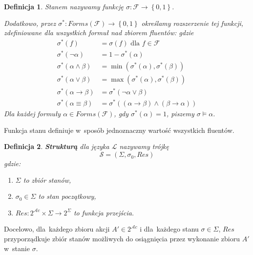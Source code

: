 \documentclass[11pt,a4paper]{article}
\newtheorem{defn}{Definicja}
\begin{document}
\begin{defn}
    Stanem nazywamy funkcję $\sigma : \mathcal{F} \rightarrow \left\{0,1\right\}$.

    Dodatkowo, przez $\sigma^{*} : Forms(\mathcal{F}) \rightarrow \left\{0,1\right\}$ określamy rozszerzenie tej funkcji, zdefiniowane dla wszystkich formuł nad zbiorem fluentów:
    gdzie
    \begin{align*}
        \sigma^{*}\left(f\right) &= \sigma\left(f\right) \text{ dla } f \in \mathcal{F} \\
        \sigma^{*}\left(\neg \alpha\right) &= 1 - \sigma^{*}\left(\alpha\right) \\
        \sigma^{*}\left(\alpha \land \beta\right) &= \min \left(\sigma^{*}\left(\alpha\right),\sigma^{*}\left(\beta\right)\right) \\
        \sigma^{*}\left(\alpha \lor \beta\right) &= \max \left(\sigma^{*}\left(\alpha\right),\sigma^{*}\left(\beta\right)\right) \\
        \sigma^{*}\left(\alpha \rightarrow \beta\right) &= \sigma^{*}\left(\neg \alpha \lor \beta\right) \\
        \sigma^{*}\left(\alpha \equiv \beta\right) &= \sigma^{*}\left(\left(\alpha \rightarrow \beta\right)\land\left(\beta \rightarrow \alpha\right)\right)
    \end{align*}
    Dla każdej formuły $\alpha \in Forms\left(\mathcal{F}\right)$, gdy $\sigma^*\left(\alpha\right) = 1$, piszemy $\sigma \models \alpha$.
\end{defn}

Funkcja stanu definiuje w~sposób jednoznaczny wartość wszystkich fluentów.

\begin{defn}
    \textbf{Strukturą} dla języka $\mathcal{L}$ nazywamy trójkę
    $$\mathcal{S} = \left(\Sigma, \sigma_0, Res\right)$$
    gdzie:
    \begin{enumerate}
        \item $\Sigma$ to zbiór stanów,
        \item $\sigma_0 \in \Sigma$ to stan początkowy,
        \item $Res : 2^{\mathcal{A}c} \times \Sigma \rightarrow 2^\Sigma$ to funkcja przejścia.
    \end{enumerate}
\end{defn}

Docelowo, dla~każdego zbioru akcji $A' \in 2^{\mathcal{A}c}$ i dla~każdego stanu $\sigma \in \Sigma$, $Res$ przyporządkuje zbiór stanów możliwych do osiągnięcia przez wykonanie zbioru $A'$ w~stanie $\sigma$.
\end{document}
